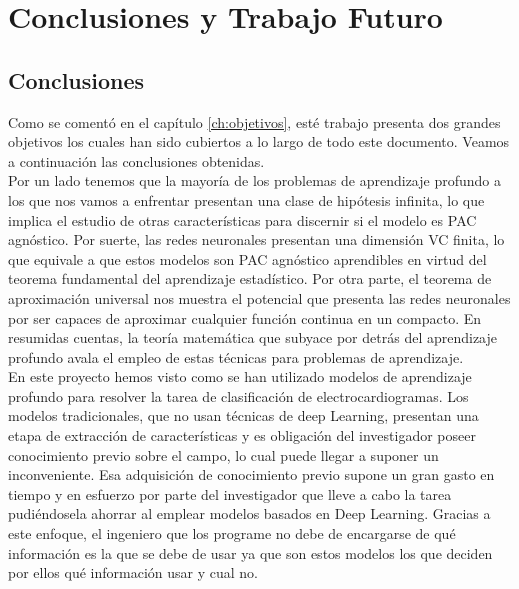 \setchapterpreamble[c][0.90\linewidth]{%
	\sffamily
  
   
	\par\bigskip
}
\chapter{Conclusiones y Trabajo Futuro}\label{ch:Conclusiones}

\section{Conclusiones}

    Como se comentó en el capítulo \ref{ch:objetivos}, esté trabajo presenta dos grandes objetivos los cuales han sido cubiertos a lo largo de todo este documento. Veamos a continuación las conclusiones obtenidas. \\
    
    Por un lado tenemos que la mayoría de los problemas de aprendizaje profundo a los que nos vamos a enfrentar presentan una clase de hipótesis infinita, lo que implica el estudio de otras características para discernir si el modelo es PAC agnóstico. Por suerte, las redes neuronales presentan una dimensión VC finita, lo que equivale a que estos modelos son PAC agnóstico aprendibles en virtud del teorema fundamental del aprendizaje estadístico. Por otra parte, el teorema de aproximación universal nos muestra el potencial que presenta las redes neuronales por ser capaces de aproximar cualquier función continua en un compacto. En resumidas cuentas, la teoría matemática que subyace por detrás del aprendizaje profundo avala el empleo de estas técnicas para problemas de aprendizaje. \\

    En este proyecto hemos visto como se han utilizado modelos de aprendizaje profundo para resolver la tarea de clasificación de electrocardiogramas. Los modelos tradicionales, que no usan técnicas de deep Learning, presentan una etapa de extracción de características y es obligación del investigador poseer conocimiento previo sobre el campo, lo cual puede llegar a suponer un inconveniente. Esa adquisición de conocimiento previo supone un gran gasto en tiempo y en esfuerzo por parte del investigador que lleve a cabo la tarea pudiéndosela ahorrar al emplear modelos basados en Deep Learning. Gracias a este enfoque, el ingeniero que los programe no debe de encargarse de qué información es la que se debe de usar ya que son estos modelos los que deciden por ellos qué información usar y cual no.  \\
    
